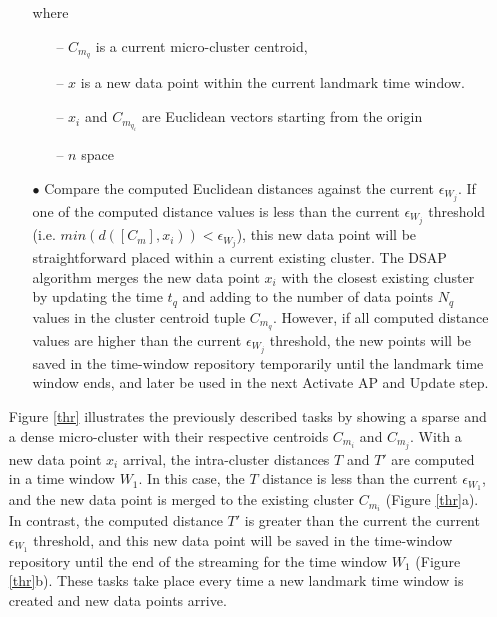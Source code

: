 \begin{itemize}[leftmargin=*]
\begin{itemize}
    where
    \begin{itemize}
        \item[--] $C_{m_q}$ is a current micro-cluster centroid,
        \item[--] $x$ is a new data point within the current landmark time window.
        \item[--] $x_{i}$ and $C_{m_{q_i}}$ are Euclidean vectors starting from the origin
        \item[--] $n$ space
    \end{itemize}
     
    


    \item[$\bullet$] Compare the computed Euclidean distances against the current $\epsilon_{W_j}$. If one of the computed distance values is less than the current $\epsilon_{W_j}$ threshold (i.e. $min(d([C_{m}],x_i)) < \epsilon_{W_j}$), this new data point will be straightforward placed within a current existing cluster. The DSAP algorithm merges the new data point $x_i$ with the closest existing cluster by updating  the time $t_q$ and adding to the number of data points $N_q$ values in the cluster centroid tuple $C_{m_q}$. However, if all computed distance values are higher than the current $\epsilon_{W_j}$ threshold, the new points will be saved in the time-window repository temporarily until the landmark time window ends, and later be used in the next Activate AP and Update step.    
\end{itemize}

Figure \ref{thr} illustrates the previously described tasks by showing a sparse and a dense micro-cluster with their respective centroids $C_{m_i}$ and $C_{m_j}$. With a new data point $x_i$ arrival, the intra-cluster distances $T$ and $T'$ are computed in a time window $W_1$. In this case, the $T$ distance is less than the current $\epsilon_{W_1}$, and the new data point is merged to the existing cluster $C_{m_i}$ (Figure \ref{thr}a). In contrast, the computed distance $T'$ is greater than the current the current $\epsilon_{W_1}$ threshold, and this new data point will be saved in the time-window repository until the end of the streaming for the time window $W_1$ (Figure \ref{thr}b). These tasks take place every time a new landmark time window is created and new data points arrive.
     

\end{itemize}

